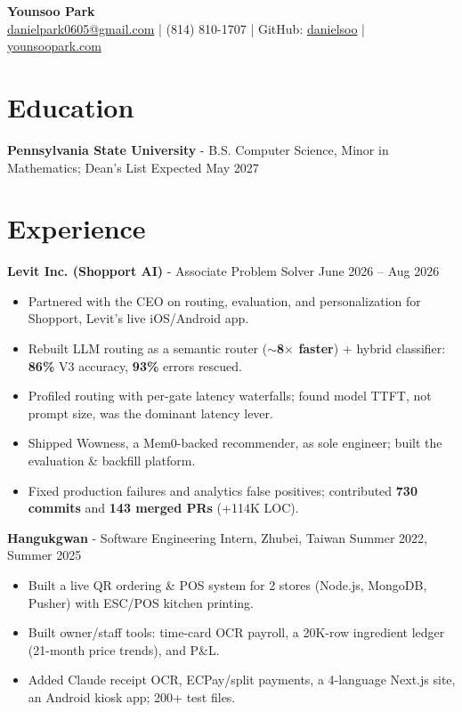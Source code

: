 \documentclass[11pt,a4paper]{article}
\newcommand{\blockspace}{\vspace{0.12em}}
\newenvironment{details}{\begin{itemize}[leftmargin=1.4em, label=\textbullet, topsep=0pt, itemsep=0pt, parsep=0pt, partopsep=0pt]}{\end{itemize}}
\begin{document}
\begin{center}
    {\LARGE \textbf{Younsoo Park}} \\
    \href{mailto:danielpark0605@gmail.com}{danielpark0605@gmail.com}
    \quad | \quad
    (814) 810-1707
    \quad | \quad
    GitHub:
    \href{https://github.com/danielsoo}{danielsoo}
    \quad | \quad
    \href{https://younsoopark.com}{younsoopark.com}
\end{center}

\section{Education}
\textbf{Pennsylvania State University} - B.S. Computer Science, Minor in Mathematics; Dean's List \hfill Expected May 2027

\section{Experience}
\noindent\textbf{Levit Inc. (Shopport AI)} - Associate Problem Solver \hfill June 2026 -- Aug 2026
\begin{details}
\item Partnered with the CEO on routing, evaluation, and personalization for Shopport, Levit's live iOS/Android app.
\item Rebuilt LLM routing as a semantic router (\textbf{$\sim$8$\times$ faster}) + hybrid classifier: \textbf{86\%} V3 accuracy, \textbf{93\%} errors rescued.
\item Profiled routing with per-gate latency waterfalls; found model TTFT, not prompt size, was the dominant latency lever.
\item Shipped Wowness, a Mem0-backed recommender, as sole engineer; built the evaluation \& backfill platform.
\item Fixed production failures and analytics false positives; contributed \textbf{730 commits} and \textbf{143 merged PRs} (+114K LOC).
\end{details}
\blockspace

\noindent\textbf{Hangukgwan} - Software Engineering Intern, Zhubei, Taiwan \hfill Summer 2022, Summer 2025
\begin{details}
\item Built a live QR ordering \& POS system for 2 stores (Node.js, MongoDB, Pusher) with ESC/POS kitchen printing.
\item Built owner/staff tools: time-card OCR payroll, a 20K-row ingredient ledger (21-month price trends), and P\&L.
\item Added Claude receipt OCR, ECPay/split payments, a 4-language Next.js site, an Android kiosk app; 200+ test files.
\end{details}
\blockspace
\end{document}
